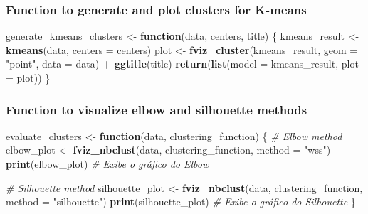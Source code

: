 \documentclass[
]{article}
\newenvironment{Shaded}{\begin{snugshade}}{\end{snugshade}}
\newcommand{\AttributeTok}[1]{\textcolor[rgb]{0.13,0.29,0.53}{#1}}
\newcommand{\CommentTok}[1]{\textcolor[rgb]{0.56,0.35,0.01}{\textit{#1}}}
\newcommand{\ControlFlowTok}[1]{\textcolor[rgb]{0.13,0.29,0.53}{\textbf{#1}}}
\newcommand{\FunctionTok}[1]{\textcolor[rgb]{0.13,0.29,0.53}{\textbf{#1}}}
\newcommand{\NormalTok}[1]{#1}
\newcommand{\OtherTok}[1]{\textcolor[rgb]{0.56,0.35,0.01}{#1}}
\newcommand{\SpecialCharTok}[1]{\textcolor[rgb]{0.81,0.36,0.00}{\textbf{#1}}}
\newcommand{\StringTok}[1]{\textcolor[rgb]{0.31,0.60,0.02}{#1}}
\begin{document}
\subsubsection{Function to generate and plot clusters for
K-means}\label{function-to-generate-and-plot-clusters-for-k-means}

\begin{Shaded}
\begin{Highlighting}[]
\NormalTok{generate\_kmeans\_clusters }\OtherTok{\textless{}{-}} \ControlFlowTok{function}\NormalTok{(data, centers, title) \{}
\NormalTok{  kmeans\_result }\OtherTok{\textless{}{-}} \FunctionTok{kmeans}\NormalTok{(data, }\AttributeTok{centers =}\NormalTok{ centers)}
\NormalTok{  plot }\OtherTok{\textless{}{-}} \FunctionTok{fviz\_cluster}\NormalTok{(kmeans\_result, }\AttributeTok{geom =} \StringTok{"point"}\NormalTok{, }\AttributeTok{data =}\NormalTok{ data) }\SpecialCharTok{+} \FunctionTok{ggtitle}\NormalTok{(title)}
  \FunctionTok{return}\NormalTok{(}\FunctionTok{list}\NormalTok{(}\AttributeTok{model =}\NormalTok{ kmeans\_result, }\AttributeTok{plot =}\NormalTok{ plot))}
\NormalTok{\}}
\end{Highlighting}
\end{Shaded}

\subsubsection{Function to visualize elbow and silhouette
methods}\label{function-to-visualize-elbow-and-silhouette-methods}

\begin{Shaded}
\begin{Highlighting}[]
\NormalTok{evaluate\_clusters }\OtherTok{\textless{}{-}} \ControlFlowTok{function}\NormalTok{(data, clustering\_function) \{}
  \CommentTok{\# Elbow method}
\NormalTok{  elbow\_plot }\OtherTok{\textless{}{-}} \FunctionTok{fviz\_nbclust}\NormalTok{(data, clustering\_function, }\AttributeTok{method =} \StringTok{"wss"}\NormalTok{)}
  \FunctionTok{print}\NormalTok{(elbow\_plot)  }\CommentTok{\# Exibe o gráfico do Elbow}
  
  \CommentTok{\# Silhouette method}
\NormalTok{  silhouette\_plot }\OtherTok{\textless{}{-}} \FunctionTok{fviz\_nbclust}\NormalTok{(data, clustering\_function, }\AttributeTok{method =} \StringTok{"silhouette"}\NormalTok{)}
  \FunctionTok{print}\NormalTok{(silhouette\_plot)  }\CommentTok{\# Exibe o gráfico do Silhouette}
\NormalTok{\}}
\end{Highlighting}
\end{Shaded}
\end{document}
